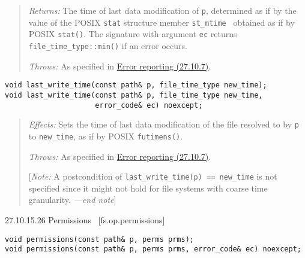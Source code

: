 \begin{quote}
\emph{Returns:} The time of last data modification of \texttt{p},
determined as if by the value of the POSIX \texttt{stat} structure
member \texttt{st\_mtime}~ obtained as if by POSIX \texttt{stat()}. The
signature with argument \texttt{ec} returns
\texttt{file\_time\_type::min()} if an error occurs.

\emph{Throws:} As specified in \hyperref[Error-reporting]{Error
reporting (27.10.7)}.
\end{quote}

\begin{verbatim}
void last_write_time(const path& p, file_time_type new_time);
void last_write_time(const path& p, file_time_type new_time,
                     error_code& ec) noexcept;
\end{verbatim}

\begin{quote}
\emph{Effects:} Sets the time of last data modification of the file
resolved to by \texttt{p} to \texttt{new\_time}, as if by POSIX
\texttt{futimens()}.

\emph{Throws:} As specified in \hyperref[Error-reporting]{Error
reporting (27.10.7)}.

{[}\emph{Note:} A postcondition of
\texttt{last\_write\_time(p)\ ==\ new\_time} is not specified since it
might not hold for file systems with coarse time granularity.
\emph{---end note}{]}
\end{quote}

27.10.15.26 Permissions~ {[}fs.op.permissions{]}

\begin{verbatim}
void permissions(const path& p, perms prms);
void permissions(const path& p, perms prms, error_code& ec) noexcept;
\end{verbatim}


